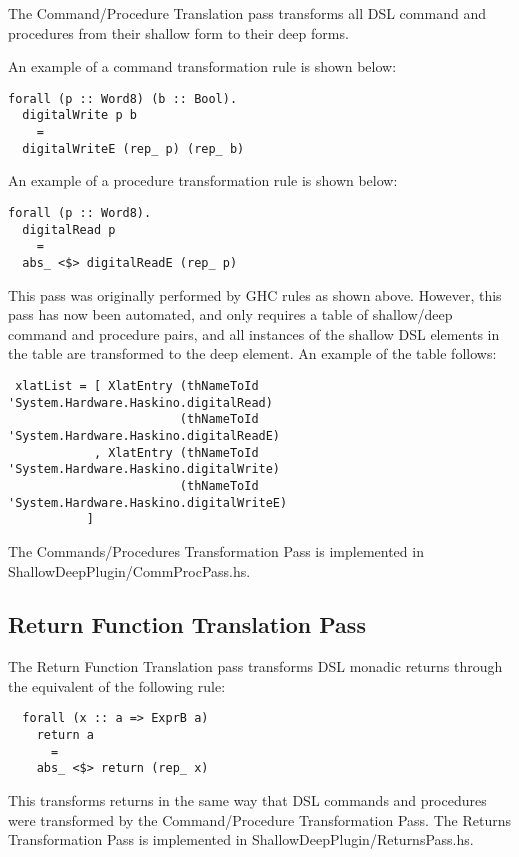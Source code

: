 \documentclass[11pt, oneside]{article}   	%
\begin{document}
The Command/Procedure Translation pass transforms all DSL command and procedures from their 
shallow form to their deep forms.

An example of a command transformation rule is shown below:

\begin{verbatim}
forall (p :: Word8) (b :: Bool).  
  digitalWrite p b  
    =  
  digitalWriteE (rep_ p) (rep_ b)  
\end{verbatim}

An example of a procedure transformation rule is shown below:

\begin{verbatim}
forall (p :: Word8).
  digitalRead p 
    =  
  abs_ <$> digitalReadE (rep_ p)
 \end{verbatim}

This pass was originally performed by GHC rules as shown above.  However,
this pass has now been automated, and only requires a table of shallow/deep
command and procedure pairs, and all instances of the shallow DSL elements
in the table are transformed to the deep element. An example of the table follows:

\begin{verbatim}
 xlatList = [ XlatEntry (thNameToId 'System.Hardware.Haskino.digitalRead)
                        (thNameToId 'System.Hardware.Haskino.digitalReadE)
            , XlatEntry (thNameToId 'System.Hardware.Haskino.digitalWrite)
                        (thNameToId 'System.Hardware.Haskino.digitalWriteE)
           ]
\end{verbatim}

The Commands/Procedures Transformation Pass is implemented in ShallowDeepPlugin/CommProcPass.hs.

\subsection{Return Function Translation Pass}

The Return Function Translation pass transforms DSL monadic returns through
the equivalent of the following rule:

\begin{verbatim}
  forall (x :: a => ExprB a)
    return a
      =
    abs_ <$> return (rep_ x)
\end{verbatim}

This transforms returns in the same way that DSL commands and procedures
were transformed by the Command/Procedure Transformation Pass.
The Returns Transformation Pass is implemented in ShallowDeepPlugin/ReturnsPass.hs.
\end{document}
